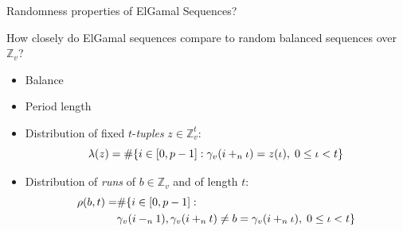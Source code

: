 \begin{frame}{Randomness properties of ElGamal Sequences?}
    
    \begin{center}
        How closely do ElGamal sequences compare to random balanced sequences over $\mathbb{Z}_v$?
    \end{center}
    
    \begin{itemize}
        \item Balance
        \item Period length
        \item Distribution of fixed $t$-\emph{tuples} $z\in\mathbb{Z}_v^t$:
        $$\lambda(z) = \#{\{i \in [0,p-1]: \gamma_v(i+_{n} \iota) = z(\iota),\; 0 \leq \iota < t\}}$$
        \item  Distribution of \emph{runs} of $b\in\mathbb{Z}_v$ and of length $t$:
        \begin{align*}
            \rho(b,t) = & \#{ \{i \in [0,p-1]: }\\
                        &\gamma_v(i-_{n} 1),\gamma_v(i+_n t) \neq b = \gamma_v(i+_n\iota),\; 0 \leq \iota < t\}
        \end{align*}
    \end{itemize}
  
  \end{frame}


  

  





  

